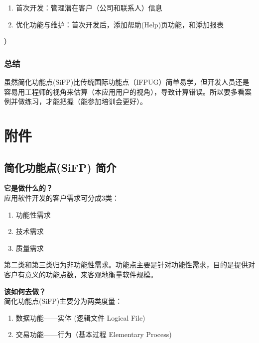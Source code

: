 \documentclass{book}        %
\providecommand{\tightlist}{%
  \setlength{\itemsep}{0pt}\setlength{\parskip}{0pt}}
\begin{document}
\begin{enumerate}
\tightlist
\item
  首次开发：管理潜在客户（公司和联系人）信息
\item
  优化功能与维护：首次开发后，添加帮助(Help)页功能，和添加报表
\end{enumerate}

）

\hypertarget{ux603bux7ed3}{%
\subsubsection{总结}\label{ux603bux7ed3}}

虽然简化功能点(SiFP)比传统国际功能点（IFPUG）简单易学，但开发人员还是容易用工程师的视角来估算（本应用用户的视角），导致计算错误。所以要多看案例并做练习，才能把握（能参加培训会更好）。

\hypertarget{ux9644ux4ef6}{%
\section{附件}\label{ux9644ux4ef6}}

\hypertarget{ux7b80ux5316ux529fux80fdux70b9sifp-ux7b80ux4ecb}{%
\subsection{简化功能点(SiFP)
简介}\label{ux7b80ux5316ux529fux80fdux70b9sifp-ux7b80ux4ecb}}

 \textbf{它是做什么的？} \\
应用软件开发的客户需求可分成3类：

\begin{enumerate}
\tightlist
\item
  功能性需求
\item
  技术需求
\item
  质量需求
\end{enumerate}

第二类和第三类归为非功能性需求。功能点主要是针对功能性需求，目的是提供对客户有意义的功能点数，来客观地衡量软件规模。

 \textbf{该如何去做？} \\
简化功能点(SiFP)主要分为两类度量：

\begin{enumerate}
\tightlist
\item
  数据功能------实体 (逻辑文件 Logical File)
\item
  交易功能------行为（基本过程 Elementary Process)
\end{enumerate}
\end{document}
